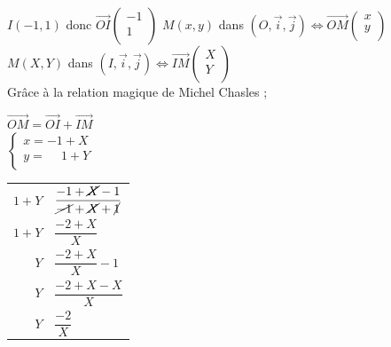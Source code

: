 \begin{enumerate}
\begin{itemize}
$I(-1,1)$ donc $\overrightarrow{OI} \left(\begin{array}{c}
                                                           -1\\
                                                           1\\
                                                      \end{array} \right)$ 
$M(x,y)$ dans $(O, \vec{i}, \vec{j}) 
      \Longleftrightarrow \overrightarrow{OM} \left(\begin{array}{c}
                                                           x\\
                                                           y\\
                                                      \end{array} \right)$\\
                                                      
$M(X,Y)$ dans $(I, \vec{i}, \vec{j}) 
      \Longleftrightarrow \overrightarrow{IM} \left(\begin{array}{c}
                                                           X\\
                                                           Y\\
                                                      \end{array} \right)$\\                               
                                                      
Grâce à la relation magique de Michel Chasles ; 

$\overrightarrow{OM} = \overrightarrow{OI} + \overrightarrow{IM} $\\

$\begin{cases}
  x =           -1 + X \\
  y = \phantom{-}1 + Y \\
 \end{cases}$ \\

{\renewcommand{\arraystretch }{1.75} 
\begin{tabular}{r@{$\;=\;$}l}
$ 1 + Y $ & $ \dfrac{-1 + \cancel{X} -1}{\cancel{-1} + \cancel{X} + \cancel{1} } $\\
$ 1 + Y $ & $ \dfrac{-2 + X}{X} $ \\
$     Y $ & $ \dfrac{-2 + X }{X} -1 $ \\
$     Y $ & $ \dfrac{-2 + X - X}{X} $ \\
$     Y $ & $ \dfrac{-2}{X} $\\
\end{tabular}\\       
} \renewcommand{\arraystretch }{1}
               

\end{itemize}
\end{enumerate}
